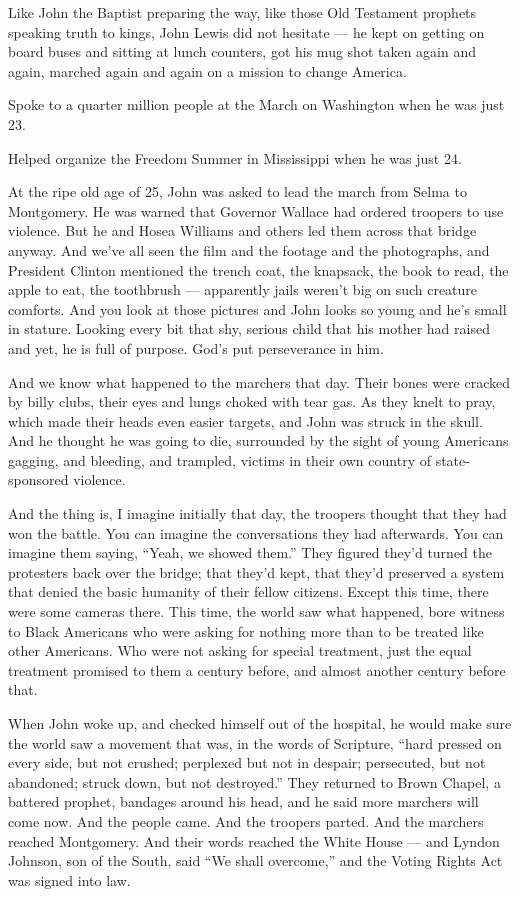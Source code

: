 Like John the Baptist preparing the way, like those Old Testament
prophets speaking truth to kings, John Lewis did not hesitate --- he
kept on getting on board buses and sitting at lunch counters, got his
mug shot taken again and again, marched again and again on a mission to
change America.

Spoke to a quarter million people at the March on Washington when he was
just 23.

Helped organize the Freedom Summer in Mississippi when he was just 24.

At the ripe old age of 25, John was asked to lead the march from Selma
to Montgomery. He was warned that Governor Wallace had ordered troopers
to use violence. But he and Hosea Williams and others led them across
that bridge anyway. And we've all seen the film and the footage and the
photographs, and President Clinton mentioned the trench coat, the
knapsack, the book to read, the apple to eat, the toothbrush ---
apparently jails weren't big on such creature comforts. And you look at
those pictures and John looks so young and he's small in stature.
Looking every bit that shy, serious child that his mother had raised and
yet, he is full of purpose. God's put perseverance in him.

And we know what happened to the marchers that day. Their bones were
cracked by billy clubs, their eyes and lungs choked with tear gas. As
they knelt to pray, which made their heads even easier targets, and John
was struck in the skull. And he thought he was going to die, surrounded
by the sight of young Americans gagging, and bleeding, and trampled,
victims in their own country of state-sponsored violence.

And the thing is, I imagine initially that day, the troopers thought
that they had won the battle. You can imagine the conversations they had
afterwards. You can imagine them saying, ``Yeah, we showed them.'' They
figured they'd turned the protesters back over the bridge; that they'd
kept, that they'd preserved a system that denied the basic humanity of
their fellow citizens. Except this time, there were some cameras there.
This time, the world saw what happened, bore witness to Black Americans
who were asking for nothing more than to be treated like other
Americans. Who were not asking for special treatment, just the equal
treatment promised to them a century before, and almost another century
before that.

When John woke up, and checked himself out of the hospital, he would
make sure the world saw a movement that was, in the words of Scripture,
``hard pressed on every side, but not crushed; perplexed but not in
despair; persecuted, but not abandoned; struck down, but not
destroyed.'' They returned to Brown Chapel, a battered prophet, bandages
around his head, and he said more marchers will come now. And the people
came. And the troopers parted. And the marchers reached Montgomery. And
their words reached the White House --- and Lyndon Johnson, son of the
South, said ``We shall overcome,'' and the Voting Rights Act was signed
into law.

